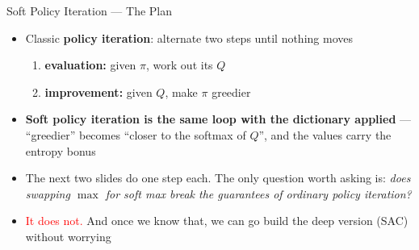\begin{frame}{Soft Policy Iteration --- The Plan}
\begin{itemize}
    \item Classic \textbf{policy iteration}: alternate two steps until nothing moves
    \begin{enumerate}
        \item \textbf{evaluation:} given $\pi$, work out its $Q$
        \item \textbf{improvement:} given $Q$, make $\pi$ greedier
    \end{enumerate}
    \vspace{0.6em}
    \item \textbf{Soft policy iteration is the same loop with the dictionary applied} --- ``greedier'' becomes ``closer to the softmax of $Q$'', and the values carry the entropy bonus
    \vspace{0.6em}
    \item The next two slides do one step each. The only question worth asking is: \emph{does swapping $\max$ for soft max break the guarantees of ordinary policy iteration?}
    \item[$\Rightarrow$] \textcolor{red}{It does not.} And once we know that, we can go build the deep version (SAC) without worrying
\end{itemize}
\end{frame}

